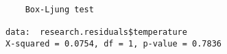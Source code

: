 \begin{verbatim} 

	Box-Ljung test

data:  research.residuals$temperature
X-squared = 0.0754, df = 1, p-value = 0.7836

\end{verbatim}